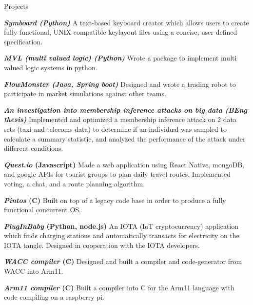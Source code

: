 \documentclass[10pt]{resume} %
\begin{document}
\begin{rSection}{Projects}

  \item \textbf{\textit{Symboard (Python)}} A text-based keyboard creator which
    allows users to create fully functional, UNIX compatible keylayout files
    using a concise, user-defined specification.
  \item \textbf{\textit{MVL (multi valued logic) (Python)}} Wrote a package to
    implement multi valued logic systems in python.
  \item \textbf{\textit{FlowMonster (Java, Spring boot)}} Designed and wrote a
    trading robot to participate in market simulations against other teams.
  \item \textbf{\textit{An investigation into membership inference attacks on
    big data (BEng thesis)}} Implemented and optimized a membership inference
    attack on 2 data sets (taxi and telecoms data) to determine if an
    individual was sampled to calculate a summary statistic, and analyzed the
    performance of the attack under different conditions.
  \item \textbf{\textit{Quest.io} (Javascript)} Made a web application using
    React Native, mongoDB, and google APIs for tourist groups to plan daily
    travel routes. Implemented voting, a chat, and a route planning algorithm.
  \item \textbf{\textit{Pintos} (C)} Built on top of a legacy code base in
    order to produce a fully functional concurrent OS.
  \item \textbf{\textit{PlugInBaby} (Python, node.js)} An IOTA (IoT
    cryptocurrency) application which finds charging stations and
    automatically transacts for electricity on the IOTA tangle. Designed in
    cooperation with the IOTA developers.
  \item \textbf{\textit{WACC compiler} (C)} Designed and built a compiler and
    code-generator from WACC into Arm11.
  \item \textbf{\textit{Arm11 compiler} (C)} Built a compiler into C for the
    Arm11 language with code compiling on a raspberry pi.

\end{rSection}

\end{document}

